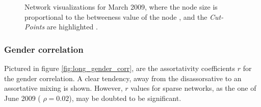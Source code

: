 \begin{figure}[htpb]%
	\centering 
	
	\qquad 			
	\caption[Network visualizations for March 2009]{Network visualizations for March 2009, where the node size is proportional to the betweeness value of the node , and the \textit{Cut-Points} are highlighted .}
	 \label{fig:graphs_march}
\end{figure} 


\subsubsection*{Gender correlation}

Pictured in figure \ref{fig:long_gender_corr}, are the assortativity coefficients $r$ for the gender correlation. A clear tendency, away from the disassorsative to an assortative mixing is shown. However, $r$ values for sparse networks, as the one of June 2009 ( $\rho = 0.02$), may be doubted to be significant.

